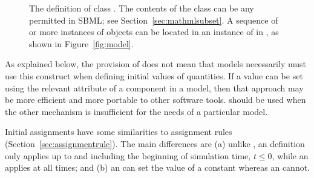 \begin{figure}[htb]
  \vspace*{-1.5ex}
  \centering
  \small
  \vspace*{-1.5ex}
  \caption{The definition of class \InitialAssignment.  The
    contents of the \Math class can be any \mathml
    permitted in SBML; see
    Section~\protect\ref{sec:mathmlsubset}.  A
    sequence of  or more instances of \InitialAssignment
    objects can be located in an instance of
    \ListOfInitialAssignments in \Model, as shown in
    Figure~\protect\ref{fig:model}.}
  \label{fig:initialAssignment}
\end{figure}

As explained below, the provision of \InitialAssignment does not
mean that models necessarily must use this construct when defining
initial values of quantities.  If a value can be set
using the relevant attribute of a component in a model, then
that approach may be more efficient and more portable to other
software tools.  \InitialAssignment should be used when the other
mechanism is insufficient for the needs of a particular model.

Initial assignments have some similarities to assignment rules
(Section~\ref{sec:assignmentrule}).  The main differences are (a)
unlike \AssignmentRule, an \InitialAssignment definition only
applies up to and including the beginning of simulation time, \ie
$t \leq 0$, while an \AssignmentRule applies at all times; and (b)
an \InitialAssignment can set the value of a constant whereas an
\AssignmentRule cannot.


